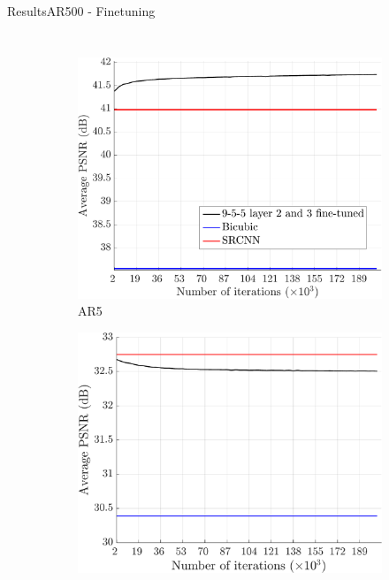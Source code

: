 \begin{frame}{Results}{AR500 - Finetuning}
    \begin{columns}
        \begin{figure}
            \centering
            \begin{subfigure}[b]{0.48\textwidth}
                \includegraphics[width=\textwidth]{sections/malte_slides/fine23-results-aleix5.pdf}
                \vspace*{-2mm}
                \caption*{\scriptsize AR5}
            \end{subfigure}
            \begin{subfigure}[b]{0.48\textwidth}
                \includegraphics[width=\textwidth]{sections/malte_slides/fine23-results-set5.pdf}

\end{subfigure}
\end{figure}
\end{columns}
\end{frame}
